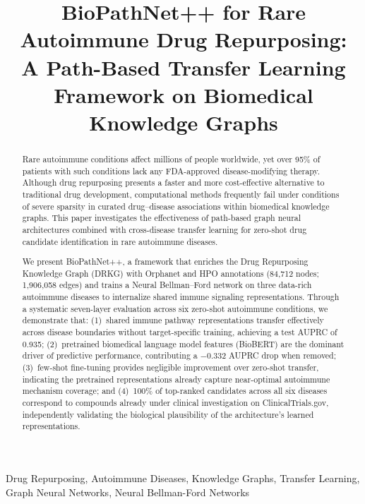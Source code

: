 \documentclass[conference]{IEEEtran}
\title{\LARGE \bf
BioPathNet++ for Rare Autoimmune Drug Repurposing:\\
A Path-Based Transfer Learning Framework on Biomedical Knowledge Graphs
}
\author{
\IEEEauthorblockN{TVNS Yatin, A Charan KR, Praveen Kumar Yadav, Srijan Jha}
\IEEEauthorblockA{PES University, Bengaluru, India}
\IEEEauthorblockA{Under the guidance of Dr.\ Priyanka H.}
}
\begin{document}
\maketitle

\begin{abstract}
Rare autoimmune conditions affect millions of people worldwide, yet over 95\% of patients with such conditions lack any FDA-approved disease-modifying therapy. Although drug repurposing presents a faster and more cost-effective alternative to traditional drug development, computational methods frequently fail under conditions of severe sparsity in curated drug--disease associations within biomedical knowledge graphs. This paper investigates the effectiveness of path-based graph neural architectures combined with cross-disease transfer learning for zero-shot drug candidate identification in rare autoimmune diseases.

We present BioPathNet++, a framework that enriches the Drug Repurposing Knowledge Graph (DRKG) with Orphanet and HPO annotations (84,712 nodes; 1,906,058 edges) and trains a Neural Bellman--Ford network on three data-rich autoimmune diseases to internalize shared immune signaling representations. Through a systematic seven-layer evaluation across six zero-shot autoimmune conditions, we demonstrate that: (1)~shared immune pathway representations transfer effectively across disease boundaries without target-specific training, achieving a test AUPRC of 0.935; (2)~pretrained biomedical language model features (BioBERT) are the dominant driver of predictive performance, contributing a $-$0.332 AUPRC drop when removed; (3)~few-shot fine-tuning provides negligible improvement over zero-shot transfer, indicating the pretrained representations already capture near-optimal autoimmune mechanism coverage; and (4)~100\% of top-ranked candidates across all six diseases correspond to compounds already under clinical investigation on ClinicalTrials.gov, independently validating the biological plausibility of the architecture's learned representations.
\end{abstract}

\begin{IEEEkeywords}
Drug Repurposing, Autoimmune Diseases, Knowledge Graphs, Transfer Learning, Graph Neural Networks, Neural Bellman-Ford Networks
\end{IEEEkeywords}
\end{document}
